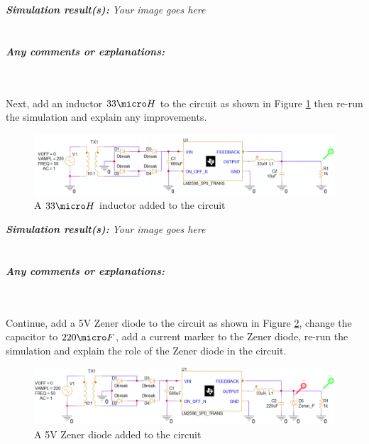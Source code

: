 \textit{\textbf{Simulation result(s):}} \textit{Your image goes here}\\
\\
\vspace{8cm}
\\
\textbf{\textit{Any comments or explanations:}}
\dotfill\bigskip\par\mbox{}\dotfill
\dotfill\bigskip\par\mbox{}\dotfill
\dotfill\bigskip\par\mbox{}\dotfill
\dotfill\bigskip\par\mbox{}\dotfill
\dotfill\bigskip\par\mbox{}\dotfill
\dotfill\bigskip\par\mbox{}\dotfill
\\
\\
Next, add an inductor $33\micro H$ to the circuit as shown in Figure \ref{lab2_ex10_step2} then re-run the simulation and explain any improvements.
\begin{figure}[H]
    \centering
    \includegraphics[width=18cm]{source/picture/bai_2/lab2_ex10_step2.png}
    \caption{A $33\micro H$ inductor added to the circuit}
    \label{lab2_ex10_step2}
\end{figure}

\textit{\textbf{Simulation result(s):}} \textit{Your image goes here}\\
\\
\vspace{8cm}
\\
\textbf{\textit{Any comments or explanations:}}
\dotfill\bigskip\par\mbox{}\dotfill
\dotfill\bigskip\par\mbox{}\dotfill
\dotfill\bigskip\par\mbox{}\dotfill
\dotfill\bigskip\par\mbox{}\dotfill
\dotfill\bigskip\par\mbox{}\dotfill
\dotfill\bigskip\par\mbox{}\dotfill
\\
\\
Continue, add a 5V Zener diode to the circuit as shown in Figure \ref{lab2_ex10_step3}, change the capacitor to $220\micro F$, add a current marker to the Zener diode, re-run the simulation and explain the role of the Zener diode in the circuit.
\begin{figure}[H]
    \centering
    \includegraphics[width=17cm]{source/picture/bai_2/lab2_ex10_step3.png}
    \caption{A 5V Zener diode added to the circuit}
    \label{lab2_ex10_step3}
\end{figure}

